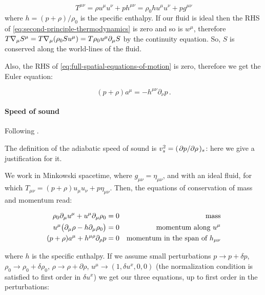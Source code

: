 \documentclass[main.tex]{subfiles}
\begin{document}
\begin{equation}
    T^{\mu\nu} = \rho u^\mu u^\nu + p h^{\mu\nu} = \rho_0 h u^{\mu} u^\nu + p g^{\mu\nu}
\end{equation}
where \(h = (p + \rho) / \rho_0\) is the specific enthalpy.
If our fluid is ideal then the RHS of \eqref{eq:second-principle-thermodynamics} is zero and so is \(w^\mu\),
therefore \(T \nabla_\mu S^\mu = T \nabla_\mu \qty(\rho_0 S u^\mu) = T \rho_0 u^\mu \partial_\mu S\) by the continuity equation.
So, \(S\) is conserved along the world-lines of the fluid.

Also, the RHS of \eqref{eq:full-spatial-equations-of-motion} is zero, therefore we get the Euler equation:

\begin{equation} \label{eq:relativistic-euler}
    (p+\rho) a^\mu = - h^{\mu \nu} \partial_\nu p \,.
\end{equation}

\paragraph{Speed of sound}

Following \cite[]{Yoshida:2011}.

The definition of the adiabatic speed of sound is \(v_s^2 = (\pdv*{p}{\rho})_s\): here we give a justification for it.

We work in Minkowski spacetime, where \(g_{\mu\nu} = \eta_{\mu\nu}\), and with an ideal fluid, for which \(T_{\mu\nu} = (p+ \rho) u_\mu u_\nu + p \eta_{\mu\nu}\). Then, the equations of conservation of mass and momentum read:

\begin{subequations}
\begin{align}
  \rho_0 \partial_\mu u^\mu + u^\mu \partial_\mu \rho_0 &= 0 & \text{mass}  \\
  u^\mu \qty(\partial_\mu \rho - h \partial_\mu \rho_0) &=0 & \text{momentum along } u^\mu  \\
  (p+\rho) a^\mu + h^{\mu \rho} \partial_\rho p &=0 & \text{momentum in the span of } h_{\mu\nu}
\end{align}
\end{subequations}

where \(h\) is the specific enthalpy. If we assume small perturbations \(p \rightarrow p + \delta p\), \(\rho_0 \rightarrow \rho_0 + \delta \rho_0\), \(\rho \rightarrow \rho + \partial \rho\), \(u^\mu \rightarrow (1, \delta u^x, 0, 0)\)
(the normalization condition is satisfied to first order in \(\delta u^x\)) we get our three equations, up to first order in the perturbations:
\end{document}
